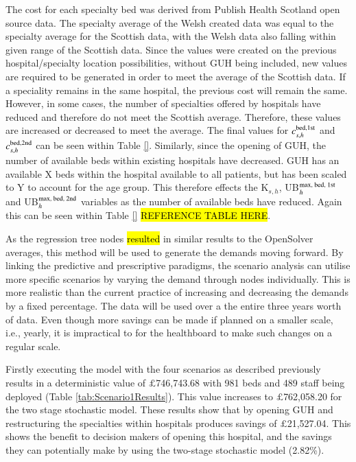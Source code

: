 \documentclass[../thesis.tex]{subfiles}
\begin{document}
The cost for each specialty bed was derived from Publish Health Scotland open source data. The specialty average of the Welsh created data was equal to the specialty average for the Scottish data, with the Welsh data also falling within given range of the Scottish data. Since the values were created on the previous hospital/specialty location possibilities, without GUH being included, new values are required to be generated in order to meet the average of the Scottish data. If a speciality remains in the same hospital, the previous cost will remain the same. However, in some cases, the number of specialties offered by hospitals have reduced and therefore do not meet the Scottish average. Therefore, these values are increased or decreased to meet the average. The final values for $c^\textnormal{bed,1st}_{s,h}$ and $c^\textnormal{bed,2nd}_{s,h}$ can be seen within Table \ref{}. Similarly, since the opening of GUH, the number of available beds within existing hospitals have decreased. GUH has an available X beds within the hospital available to all patients, but has been scaled to Y to account for the age group. This therefore effects the K$_{s,h}$, UB$^\textnormal{max, bed, 1st}_{h}$ and UB$^\textnormal{max, bed, 2nd}_{h}$ variables as the number of available beds have reduced. Again this can be seen within Table \ref{} \hl{REFERENCE TABLE HERE}.


As the regression tree nodes \hl{resulted} in similar results to the OpenSolver averages, this method will be used to generate the demands moving forward. By linking the predictive and prescriptive paradigms, the scenario analysis can utilise more specific scenarios by varying the demand through nodes individually. This is more realistic than the current practice of increasing and decreasing the demands by a fixed percentage. The data will be used over a the entire three years worth of data. Even though more savings can be made if planned on a smaller scale, i.e., yearly, it is impractical to for the healthboard to make such changes on a regular scale.

Firstly executing the model with the four scenarios as described previously results in a deterministic value of $\pounds$746,743.68 with 981 beds and 489 staff being deployed (Table \ref{tab:Scenario1Results}). This value increases to $\pounds$762,058.20 for the two stage stochastic model. These results show that by opening GUH and restructuring the specialties within hospitals produces savings of $\pounds$21,527.04. This shows the benefit to decision makers of opening this hospital, and the savings they can potentially make by using the two-stage stochastic model (2.82\%).
\end{document}
